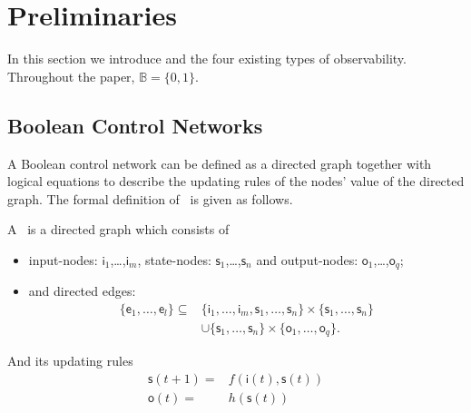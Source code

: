 
\section{Preliminaries} 
\label{sec:pre}
In this section we introduce {\BCNs} and the four existing types of observability. Throughout the paper,  $\mathbb{B}=\{0,1\}$.

\subsection{Boolean Control Networks}

A Boolean control network can be defined as a directed graph together with logical equations to describe the updating rules of the nodes' value of the directed graph. The formal definition of \BCN\ is given as follows. 

\begin{definition} A \BCN\
	is a directed graph which consists of 
	\begin{itemize}
	\item input-nodes: {$\mathsf{i}_1$,\ldots ,$\mathsf{i}_m$}, state-nodes: {$\mathsf{s}_1$,\ldots ,$\mathsf{s}_n$} and output-nodes: {$\mathsf{o}_1$,\ldots ,$\mathsf{o}_q$};
	\item and directed edges: 
		\begin{equation*}
			\begin{split}
				\{\mathsf{e}_1,\ldots,\mathsf{e}_l\}\subseteq & \{\mathsf{i}_1,\ldots ,\mathsf{i}_m,\mathsf{s}_1,\ldots ,\mathsf{s}_n\}\times \{\mathsf{s}_1,\ldots ,\mathsf{s}_n\} \\
				&\cup \{\mathsf{s}_1,\ldots ,\mathsf{s}_n\}\times\{\mathsf{o}_1,\ldots ,\mathsf{o}_q\}. 
			\end{split}
		\end{equation*}
	
\end{itemize}	
And its updating rules
\begin{equation}
\begin{split}
\mathsf{s}(t+1)=&f(\mathsf{i}(t),\mathsf{s}(t))\\
\mathsf{o}(t)=&h(\mathsf{s}(t))
\end{split}
\label{equ:1}
\end{equation}
 \end{definition}

